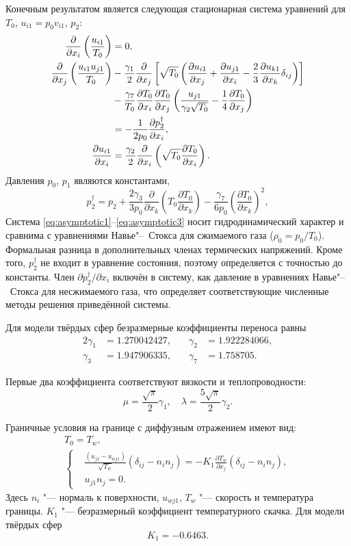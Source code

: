\documentclass[english,russian,a4paper,10pt]{article}
\newcommand{\pder}[2][]{\frac{\partial#1}{\partial#2}}
\begin{document}
Конечным результатом является следующая стационарная система уравнений для \(T_0\), \(u_{i1} = p_0v_{i1}\), \(p_2\):
\begin{align}
	\pder{x_i}\left(\frac{u_{i1}}{T_0}\right) &= 0, \label{eq:asymptotic1} \\
	\pder{x_j}\left(\frac{u_{i1}u_{j1}}{T_0}\right)
		&-\frac{\gamma_1}2\pder{x_j}\left[\sqrt{T_0}\left(
			\pder[u_{i1}]{x_j}+\pder[u_{j1}]{x_i}-\frac23\pder[u_{k1}]{x_k}\delta_{ij}\right
		)\right] \notag\\
		&- \frac{\gamma_7}{T_0}\pder[T_0]{x_i}\pder[T_0]{x_j}\left(\frac{u_{j1}}{\gamma_2\sqrt{T_0}} - \frac{1}4\pder[T_0]{x_j}\right) \notag\\
		&= -\frac1{2p_0}\pder[p_2^\dag]{x_i}, \label{eq:asymptotic2} \\
	\pder[u_{i1}]{x_i} &= \frac{\gamma_2}2\pder{x_i}\left(\sqrt{T_0}\pder[T_0]{x_i}\right). \label{eq:asymptotic3}
\end{align}
Давления \(p_0\), \(p_1\) являются константами,
\[ 
	p_2^\dag = p_2 + 
		\frac{2\gamma_3}{3p_0}\pder{x_k}\left(T_0\pder[T_0]{x_k}\right) -
		\frac{\gamma_7}{6p_0}\left(\pder[T_0]{x_k}\right)^2,
\]
Система \eqref{eq:asymptotic1}--\eqref{eq:asymptotic3} носит гидродинамический характер
и сравнима с уравнениями Навье"--~Стокса для сжимаемого газа (\(\rho_0 = p_0/T_0\)).
Формальная разница в дополнительных членах термических напряжений.
Кроме того, \(p_2^\dag\) не входит в уравнение состояния, поэтому определяется с точностью до константы.
Член \(\partial{p_2^\dag}/\partial{x_i}\) включён в систему,
как давление в уравнениях Навье"--~Стокса для несжимаемого газа,
что определяет соответствующие численные методы решения приведённой системы.

Для модели твёрдых сфер безразмерные коэффициенты переноса равны
\begin{alignat*}{2}
	\gamma_1 &= 1.270042427, &\quad \gamma_2 &= 1.922284066, \\
	\gamma_3 &= 1.947906335, &\quad \gamma_7 &= 1.758705.
\end{alignat*}

Первые два коэффициента соответствуют вязкости и теплопроводности:
\[ \mu = \frac{\sqrt\pi}2\gamma_1, \quad \lambda = \frac{5\sqrt\pi}2\gamma_2. \]

Граничные условия на границе с диффузным отражением имеют вид:
\begin{gather}
	T_0 = T_w, \label{eq:bound:T} \\
	\left\{
	\begin{aligned}
		& \frac{(u_{j1}-u_{wj1})}{\sqrt{T_w}}(\delta_{ij}-n_in_j) = 
			-K_1\pder[T_w]{x_j}(\delta_{ij}-n_in_j), \\
		& u_{j1}n_j = 0.
	\end{aligned}
	\right. \label{eq:bound:v}
\end{gather}
Здесь \(n_i\) "--- нормаль к поверхности, \(u_{wj1}\), \(T_w\) "--- скорость и температура границы.
\(K_1\) "--- безразмерный коэффициент температурного скачка. Для модели твёрдых сфер 
\[ K_1 = -0.6463. \]
\end{document}
